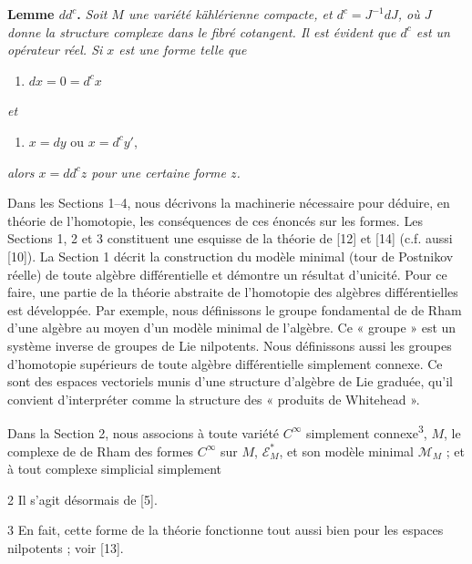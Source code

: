 \documentclass[
  french,
  a3paper,
  a3paper]{extarticle}
\providecommand{\tightlist}{%
  \setlength{\itemsep}{0pt}\setlength{\parskip}{0pt}}
\begin{document}
\textbf{Lemme \(dd^c\).} \emph{Soit \(M\) une variété kählérienne
compacte, et \(d^c=J^{-1}dJ\), où \(J\) donne la structure complexe dans
le fibré cotangent. Il est évident que \(d^c\) est un opérateur réel. Si
\(x\) est une forme telle que}

\begin{enumerate}
\def\labelenumi{\arabic{enumi})}
\tightlist
\item
  \(dx=0=d^c x\)
\end{enumerate}

\emph{et}

\begin{enumerate}
\def\labelenumi{\arabic{enumi})}
\setcounter{enumi}{1}
\tightlist
\item
  \(x=dy\) ou \(x=d^c y'\),
\end{enumerate}

\emph{alors \(x=dd^c z\) pour une certaine forme \(z\).}

Dans les Sections 1--4, nous décrivons la machinerie nécessaire pour
déduire, en théorie de l'homotopie, les conséquences de ces énoncés sur
les formes. Les Sections 1, 2 et 3 constituent une esquisse de la
théorie de {[}12{]} et {[}14{]} (c.f. aussi {[}10{]}). La Section 1
décrit la construction du modèle minimal (tour de Postnikov réelle) de
toute algèbre différentielle et démontre un résultat d'unicité. Pour ce
faire, une partie de la théorie abstraite de l'homotopie des algèbres
différentielles est développée. Par exemple, nous définissons le groupe
fondamental de de Rham d'une algèbre au moyen d'un modèle minimal de
l'algèbre. Ce « groupe » est un système inverse de groupes de Lie
nilpotents. Nous définissons aussi les groupes d'homotopie supérieurs de
toute algèbre différentielle simplement connexe. Ce sont des espaces
vectoriels munis d'une structure d'algèbre de Lie graduée, qu'il
convient d'interpréter comme la structure des « produits de Whitehead ».

Dans la Section 2, nous associons à toute variété \(C^\infty\)
simplement connexe\textsuperscript{3}, \(M\), le complexe de de Rham des
formes \(C^\infty\) sur \(M\), \(\mathscr E_M^*\), et son modèle minimal
\(\mathcal M_M\) ; et à tout complexe simplicial simplement

2 Il s'agit désormais de {[}5{]}.

3 En fait, cette forme de la théorie fonctionne tout aussi bien pour les
espaces nilpotents ; voir {[}13{]}.

\clearpage

\end{document}
